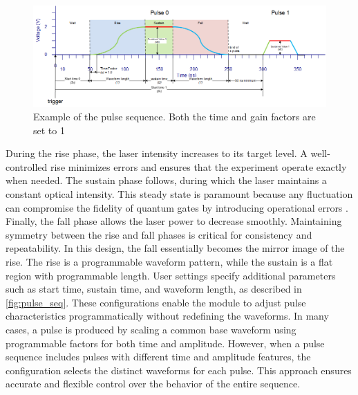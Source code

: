 \begin{figure}[ht]
    \setlength{\abovecaptionskip}{5pt}    %
    \setlength{\belowcaptionskip}{5pt}    %
    \centering
    \includegraphics[width=1\linewidth]{figures/2.1.png}
    \caption{Example of the pulse sequence. Both the time and gain factors are set to 1}
    \label{fig:pulse_seq}
\end{figure}

During the rise phase, the laser intensity increases to its target level. A well-controlled rise minimizes errors and ensures that the experiment operate exactly when needed. The sustain phase follows, during which the laser maintains a constant optical intensity. This steady state is paramount because any fluctuation can compromise the fidelity of quantum gates by introducing operational errors \cite{naturequantuminfo}. Finally, the fall phase allows the laser power to decrease smoothly. Maintaining symmetry between the rise and fall phases is critical for consistency and repeatability. In this design, the fall essentially becomes the mirror image of the rise. The rise is a programmable waveform pattern, while the sustain is a flat region with programmable length. 
User settings specify additional parameters such as start time, sustain time, and waveform length, as described in \autoref{fig:pulse_seq}. These configurations enable the module to adjust pulse characteristics programmatically without redefining the waveforms. In many cases, a pulse is produced by scaling a common base waveform using programmable factors for both time and amplitude. However, when a pulse sequence includes pulses with different time and amplitude features, the configuration selects the distinct waveforms for each pulse. This approach ensures accurate and flexible control over the behavior of the entire sequence. 


